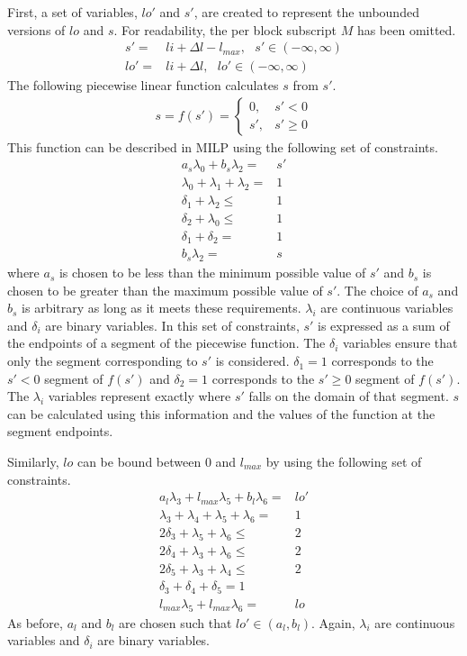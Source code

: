 First, a set of variables, $lo'$ and $s'$, are created to represent the
unbounded versions of $lo$ and $s$. For readability, the per block subscript
$M$ has been omitted.
\begin{align*}
  s' =& li + \Delta l - l_{max}, \text{ } s' \in (-\infty, \infty)\\
  lo' =& li + \Delta l, \text{ } lo' \in (-\infty, \infty) 
\end{align*}
The following piecewise linear function calculates $s$ from $s'$.
\begin{align*}
  s = f(s') = 
    \begin{cases} 
    0, &s' < 0\\
    s', &s' \geq 0
    \end{cases}
\end{align*}
This function can be described in MILP using the following set of constraints.
\begin{align*}
  a_s\lambda_0 + b_s\lambda_2 =& s'\\
  \lambda_0 + \lambda_1 + \lambda_2 =& 1 \\
  \delta_1 + \lambda_2 \leq& 1 \\
  \delta_2 + \lambda_0 \leq& 1 \\
  \delta_1 + \delta_2 =& 1 \\
  b_s\lambda_2 =& s
\end{align*}
where $a_s$ is chosen to be less than the minimum possible value of $s'$ and
$b_s$ is chosen to be greater than the maximum possible value of $s'$. The
choice of $a_s$ and $b_s$ is arbitrary as long as it meets these requirements.
$\lambda_i$ are continuous variables and $\delta_i$ are binary variables. In
this set of constraints, $s'$ is expressed as a sum of the endpoints of a
segment of the piecewise function. The $\delta_i$ variables ensure that only
the segment corresponding to $s'$ is considered. $\delta_1 = 1$ corresponds to
the $s' < 0$ segment of $f(s')$ and $\delta_2 = 1$ corresponds to the $s' \geq
0$ segment of $f(s')$. The $\lambda_i$ variables represent exactly where $s'$
falls on the domain of that segment. $s$ can be calculated using this
information and the values of the function at the segment endpoints.

Similarly, $lo$ can be bound between $0$ and $l_{max}$ by using the following
set of constraints.
\begin{align*}
  a_l\lambda_3 + l_{max}\lambda_5 + b_l\lambda_6 =& lo'\\
  \lambda_3 + \lambda_4 + \lambda_5 + \lambda_6 =& 1 \\
  2 \delta_3 + \lambda_5 + \lambda_6 \leq& 2 \\
  2 \delta_4 + \lambda_3 + \lambda_6 \leq& 2 \\
  2 \delta_5 + \lambda_3 + \lambda_4 \leq& 2 \\
  \delta_3 + \delta_4 + \delta_5 = 1 \\
  l_{max}\lambda_5 + l_{max}\lambda_6 =& lo
\end{align*}
As before, $a_l$ and $b_l$ are chosen such that $lo' \in (a_l, b_l)$.  Again,
$\lambda_i$ are continuous variables and $\delta_i$  are binary variables.

